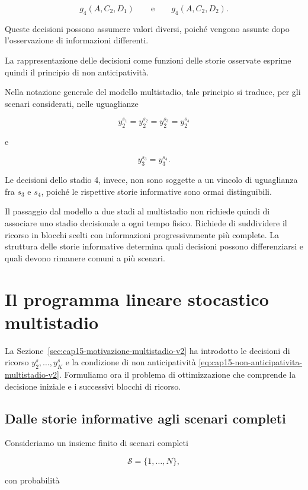 \[
g_4(A,C_2,D_1)
\qquad\text{e}\qquad
g_4(A,C_2,D_2).
\]

Queste decisioni possono assumere
valori diversi, poich\'{e} vengono
assunte dopo l'osservazione di
informazioni differenti.

La rappresentazione delle decisioni
come funzioni delle storie osservate
esprime quindi il principio di
non anticipativit\`{a}.

Nella notazione generale del modello
multistadio, tale principio si traduce,
per gli scenari considerati, nelle
uguaglianze

\[
y_2^{s_1}
=
y_2^{s_2}
=
y_2^{s_3}
=
y_2^{s_4}
\]

e

\[
y_3^{s_3}
=
y_3^{s_4}.
\]

Le decisioni dello stadio 4,
invece, non sono soggette
a un vincolo di uguaglianza
fra $s_3$ e $s_4$, poich\'{e}
le rispettive storie informative
sono ormai distinguibili.


Il passaggio dal modello a due stadi
al multistadio non richiede quindi
di associare uno stadio decisionale
a ogni tempo fisico. Richiede
di suddividere il ricorso in blocchi
scelti con informazioni progressivamente
pi\`u complete. La struttura
delle storie informative determina
quali decisioni possono differenziarsi
e quali devono rimanere comuni
a pi\`u scenari.

\section{Il programma lineare stocastico multistadio}

\label{sec:cap15-programma-multistadio-v2}

La Sezione~\ref{sec:cap15-motivazione-multistadio-v2}
ha introdotto le decisioni di ricorso
$y_2^s,\ldots,y_K^s$ e la condizione
di non anticipativit\`a
\eqref{eq:cap15-non-anticipativita-multistadio-v2}.
Formuliamo ora il problema di ottimizzazione
che comprende la decisione iniziale e
i successivi blocchi di ricorso.


\subsection{Dalle storie informative agli scenari completi}

Consideriamo un insieme finito di scenari completi

\[
\mathcal S=\{1,\ldots,N\},
\]

\noindent con probabilit\`a

